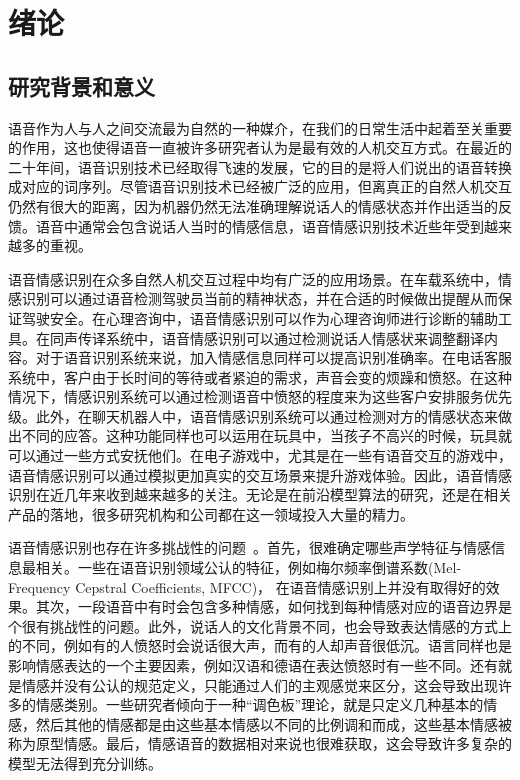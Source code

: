 \chapter{绪论}
\label{cha:intro}

\section{研究背景和意义}
\label{sec:background}
语音作为人与人之间交流最为自然的一种媒介，在我们的日常生活中起着至关重要的作用，这也使得语音一直被许多研究者认为是最有效的人机交互方式。在最近的二十年间，语音识别技术已经取得飞速的发展，它的目的是将人们说出的语音转换成对应的词序列。尽管语音识别技术已经被广泛的应用，但离真正的自然人机交互仍然有很大的距离，因为机器仍然无法准确理解说话人的情感状态并作出适当的反馈。语音中通常会包含说话人当时的情感信息，语音情感识别技术近些年受到越来越多的重视。

语音情感识别在众多自然人机交互过程中均有广泛的应用场景。在车载系统中，情感识别可以通过语音检测驾驶员当前的精神状态，并在合适的时候做出提醒从而保证驾驶安全。在心理咨询中，语音情感识别可以作为心理咨询师进行诊断的辅助工具。在同声传译系统中，语音情感识别可以通过检测说话人情感状来调整翻译内容。对于语音识别系统来说，加入情感信息同样可以提高识别准确率。在电话客服系统中，客户由于长时间的等待或者紧迫的需求，声音会变的烦躁和愤怒。在这种情况下，情感识别系统可以通过检测语音中愤怒的程度来为这些客户安排服务优先级。此外，在聊天机器人中，语音情感识别系统可以通过检测对方的情感状态来做出不同的应答。这种功能同样也可以运用在玩具中，当孩子不高兴的时候，玩具就可以通过一些方式安抚他们。在电子游戏中，尤其是在一些有语音交互的游戏中，语音情感识别可以通过模拟更加真实的交互场景来提升游戏体验。因此，语音情感识别在近几年来收到越来越多的关注。无论是在前沿模型算法的研究，还是在相关产品的落地，很多研究机构和公司都在这一领域投入大量的精力。

语音情感识别也存在许多挑战性的问题~\cite{Ayadi2011Survey, Han2014Survey}。首先，很难确定哪些声学特征与情感信息最相关。一些在语音识别领域公认的特征，例如梅尔频率倒谱系数(Mel-Frequency Cepstral Coefficients, MFCC)， 在语音情感识别上并没有取得好的效果。其次，一段语音中有时会包含多种情感，如何找到每种情感对应的语音边界是个很有挑战性的问题。此外，说话人的文化背景不同，也会导致表达情感的方式上的不同，例如有的人愤怒时会说话很大声，而有的人却声音很低沉。语言同样也是影响情感表达的一个主要因素，例如汉语和德语在表达愤怒时有一些不同。还有就是情感并没有公认的规范定义，只能通过人们的主观感觉来区分，这会导致出现许多的情感类别。一些研究者倾向于一种“调色板”理论，就是只定义几种基本的情感，然后其他的情感都是由这些基本情感以不同的比例调和而成，这些基本情感被称为原型情感。最后，情感语音的数据相对来说也很难获取，这会导致许多复杂的模型无法得到充分训练。

